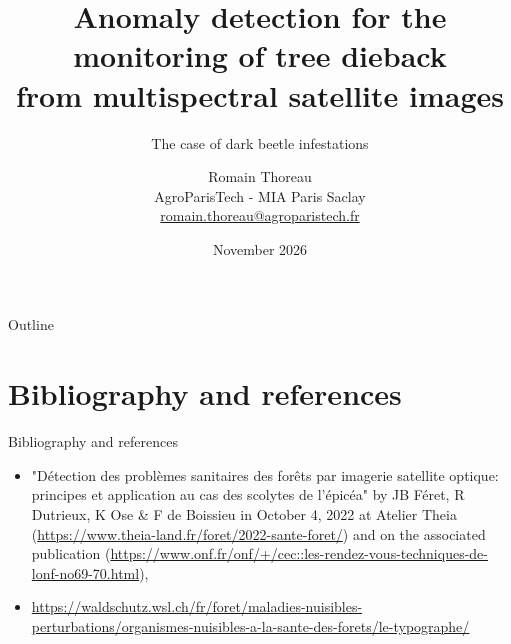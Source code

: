 \documentclass[aspectratio=169, 9pt]{beamer}
\title{Anomaly detection for the monitoring of tree dieback \\ from multispectral satellite images}
\subtitle{The case of dark beetle infestations}
\author[Romain Thoreau]{
	Romain Thoreau \\ AgroParisTech - MIA Paris Saclay
	\\ \url{romain.thoreau@agroparistech.fr}
}
\institute[AgroParisTech]
\date{November 2026}
\begin{document}
\begin{frame}
\titlepage %
\end{frame}
\begin{frame}{Outline}
\tableofcontents
\end{frame}
\section{Bibliography and references}
\begin{frame}{Bibliography and references}

\begin{itemize}[label=$\bullet$]
	\item "Détection des problèmes sanitaires des forêts par imagerie satellite optique: principes et application au cas des scolytes de l’épicéa" by JB Féret, R Dutrieux, K Ose \& F de Boissieu in October 4, 2022 at Atelier Theia (\url{https://www.theia-land.fr/foret/2022-sante-foret/}) and on the associated publication (\url{https://www.onf.fr/onf/+/cec::les-rendez-vous-techniques-de-lonf-no69-70.html}),
	\item \url{https://waldschutz.wsl.ch/fr/foret/maladies-nuisibles-perturbations/organismes-nuisibles-a-la-sante-des-forets/le-typographe/}
\end{itemize}


\end{frame}
\end{document}
